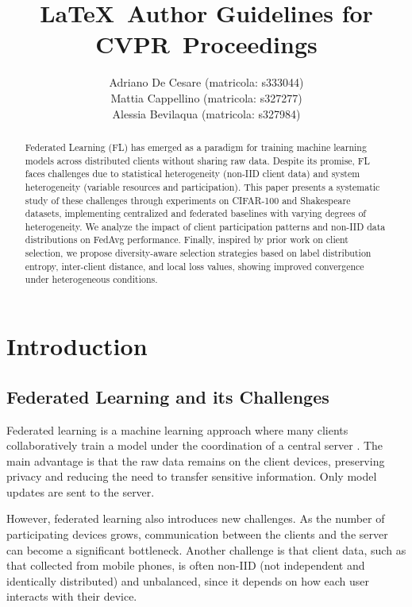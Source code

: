 \documentclass[10pt,twocolumn,letterpaper]{article}
\def\confName{CVPR}
\begin{document}
\title{\LaTeX\ Author Guidelines for \confName~Proceedings}

\author{
Adriano De Cesare (matricola: s333044)\\
Mattia Cappellino (matricola: s327277)\\
Alessia Bevilaqua (matricola: s327984)\\
}
\maketitle

\begin{abstract}
  Federated Learning (FL) has emerged as a paradigm for training machine learning models across distributed clients without sharing raw data. 
  Despite its promise, FL faces challenges due to statistical heterogeneity (non-IID client data) and system heterogeneity (variable resources and participation). 
  This paper presents a systematic study of these challenges through experiments on CIFAR-100 and Shakespeare datasets, implementing centralized and federated baselines with varying degrees of heterogeneity. 
  We analyze the impact of client participation patterns and non-IID data distributions on FedAvg performance. 
  Finally, inspired by prior work on client selection, we propose diversity-aware selection strategies based on label distribution entropy, inter-client distance, and local loss values, showing improved convergence under heterogeneous conditions.
\end{abstract}

\section{Introduction}
\label{sec:intro}
\subsection{Federated Learning and its Challenges}
Federated learning is a machine learning approach where many clients collaboratively train a model under the coordination of a central server \cite{Paper03}. The main advantage is that the raw data remains on the client devices, preserving privacy and reducing the need to transfer sensitive information. Only model updates are sent to the server.

However, federated learning also introduces new challenges. As the number of participating devices grows, communication between the clients and the server can become a significant bottleneck. Another challenge is that client data, such as that collected from mobile phones, is often non-IID (not independent and identically distributed) and unbalanced, since it depends on how each user interacts with their device.
\end{document}
